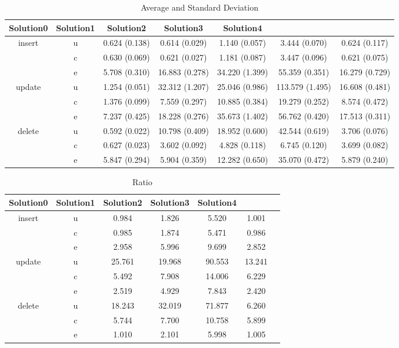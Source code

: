 \begin{table}[h]
\newcommand{\B}[1]{\colorbox{light-gray}{#1}}
 \centering
\caption{Average and Standard Deviation}\label{t:}
\begin{tabular}{ccccccc}
\toprule
Solution0 & Solution1 & Solution2 & Solution3 & Solution4\\
\midrule
\multirow{3}{*}{insert} & u & 0.624 (0.138) & 0.614 (0.029) & 1.140 (0.057) & 3.444 (0.070) & 0.624 (0.117)\\
 & c & 0.630 (0.069) & 0.621 (0.027) & 1.181 (0.087) & 3.447 (0.096) & 0.621 (0.075)\\
 & e & 5.708 (0.310) & 16.883 (0.278) & 34.220 (1.399) & 55.359 (0.351) & 16.279 (0.729)\\
\midrule
\multirow{3}{*}{update} & u & 1.254 (0.051) & 32.312 (1.207) & 25.046 (0.986) & 113.579 (1.495) & 16.608 (0.481)\\
 & c & 1.376 (0.099) & 7.559 (0.297) & 10.885 (0.384) & 19.279 (0.252) & 8.574 (0.472)\\
 & e & 7.237 (0.425) & 18.228 (0.276) & 35.673 (1.402) & 56.762 (0.420) & 17.513 (0.311)\\
\midrule
\multirow{3}{*}{delete} & u & 0.592 (0.022) & 10.798 (0.409) & 18.952 (0.600) & 42.544 (0.619) & 3.706 (0.076)\\
 & c & 0.627 (0.023) & 3.602 (0.092) & 4.828 (0.118) & 6.745 (0.120) & 3.699 (0.082)\\
 & e & 5.847 (0.294) & 5.904 (0.359) & 12.282 (0.650) & 35.070 (0.472) & 5.879 (0.240)\\
\bottomrule
\end{tabular}
\end{table}
\begin{table}[h]
\newcommand{\B}[1]{\colorbox{light-gray}{#1}}
 \centering
\caption{Ratio}\label{t:}
\begin{tabular}{ccccccc}
\toprule
Solution0 & Solution1 & Solution2 & Solution3 & Solution4\\
\midrule
\multirow{3}{*}{insert} & u & 0.984 & 1.826 & 5.520 & 1.001\\
 & c & 0.985 & 1.874 & 5.471 & 0.986\\
 & e & 2.958 & 5.996 & 9.699 & 2.852\\
\midrule
\multirow{3}{*}{update} & u & 25.761 & 19.968 & 90.553 & 13.241\\
 & c & 5.492 & 7.908 & 14.006 & 6.229\\
 & e & 2.519 & 4.929 & 7.843 & 2.420\\
\midrule
\multirow{3}{*}{delete} & u & 18.243 & 32.019 & 71.877 & 6.260\\
 & c & 5.744 & 7.700 & 10.758 & 5.899\\
 & e & 1.010 & 2.101 & 5.998 & 1.005\\
\bottomrule
\end{tabular}
\end{table}
